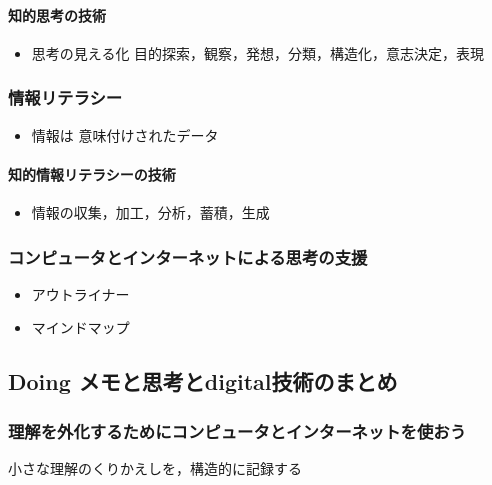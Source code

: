 \documentclass[dvipdfmx,11pat]{jarticle}
\begin{document}
\paragraph*{知的思考の技術}
\label{sec:org2d8ae65}
\begin{itemize}
\item 思考の見える化
目的探索，観察，発想，分類，構造化，意志決定，表現
\end{itemize}

\subsubsection*{情報リテラシー}
\label{sec:org863fd49}

\begin{itemize}
\item 情報は 意味付けされたデータ
\end{itemize}

\paragraph*{知的情報リテラシーの技術}
\label{sec:orgba7ae4c}

\begin{itemize}
\item 情報の収集，加工，分析，蓄積，生成
\end{itemize}

\subsubsection*{コンピュータとインターネットによる思考の支援}
\label{sec:org1f54527}

\begin{itemize}
\item アウトライナー
\item マインドマップ
\end{itemize}

\subsection*{{\bfseries\sffamily Doing} メモと思考とdigital技術のまとめ}
\label{sec:org862b3fa}
\subsubsection*{理解を外化するためにコンピュータとインターネットを使おう}
\label{sec:orgc6ec9dd}

小さな理解のくりかえしを，構造的に記録する
\end{document}
